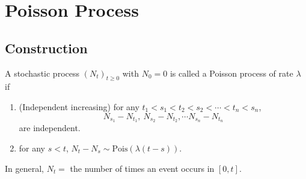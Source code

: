 \chapter{Poisson Process}

\section{Construction}

\begin{defn}
    A stochastic process $(N_t)_{t \geq 0}$ with $N_0 = 0$ is called a Poisson process of rate $\lambda$ if
    \begin{enumerate}[label=(\roman{*})]
        \item (Independent increasing) for any $t_1<s_1<t_2<s_2 < \cdots < t_n < s_n$,
        \begin{equation*}
            N_{s_1}-N_{t_1},~N_{s_2}-N_{t_2},\cdots N_{s_n}-N_{t_n}
        \end{equation*}
        are independent.
        \item for any $s < t$, $N_t - N_s \sim \text{Pois}(\lambda(t-s))$.
    \end{enumerate}
\end{defn}
\begin{rmk}
    In general, $N_t = $ the number of times an event occurs in $[0,t]$.
\end{rmk}

